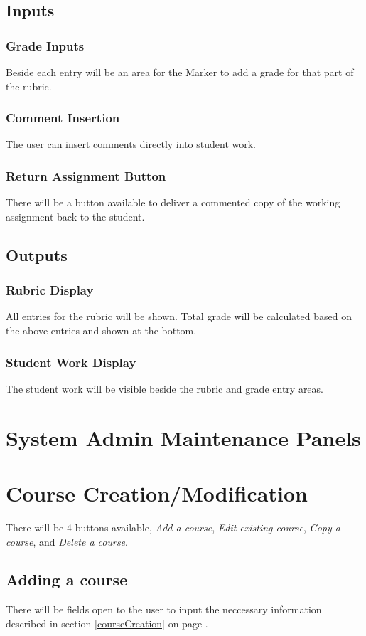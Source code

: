 \documentclass{article}
\begin{document}
\subsection{Inputs}
\subsubsection{Grade Inputs}
Beside each entry will be an
area for the Marker to add a grade for that part of the rubric.
\subsubsection{Comment Insertion}
The user can insert comments directly into student work.
\subsubsection{Return Assignment Button}
There will be a button available to deliver a commented copy of the working
assignment back to the student.
\subsection{Outputs}
\subsubsection{Rubric Display}
All entries for the rubric will be shown.
Total grade will be calculated based on the above entries and shown at the
bottom.
\subsubsection{Student Work Display}
The student work will be visible beside the rubric and grade entry areas.

\section{System Admin Maintenance Panels}

\section{Course Creation/Modification}
There will be 4 buttons available, \emph{Add a course}, \emph{Edit existing course},
\emph{Copy a course}, and \emph{Delete a course}.

\subsection{Adding a course}
There will be fields open to the user to input the neccessary information described
in section \ref{courseCreation} on page \pageref{courseCreation}.
\end{document}
